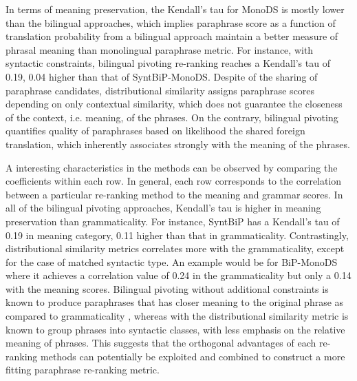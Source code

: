 \documentclass[11pt]{article}
\begin{document}
In terms of meaning preservation, the Kendall's tau for MonoDS is mostly lower than the bilingual approaches, which implies paraphrase score as a function of translation probability from a bilingual approach maintain a better measure of phrasal meaning than monolingual paraphrase metric. For instance, with syntactic constraints, bilingual pivoting re-ranking reaches a Kendall's tau of 0.19, 0.04 higher than that of SyntBiP-MonoDS. Despite of the sharing of paraphrase candidates, distributional similarity assigns paraphrase scores depending on only contextual similarity, which does not guarantee the closeness of the context, i.e. meaning, of the phrases. On the contrary, bilingual pivoting quantifies quality of paraphrases based on likelihood the shared foreign translation, which inherently associates strongly with the meaning of the phrases.

A interesting characteristics in the methods can be observed by comparing the coefficients within each row. In general, each row corresponds to the correlation between a particular re-ranking method to the meaning and grammar scores. In all of the bilingual pivoting approaches, Kendall's tau is higher in meaning preservation than grammaticality. For instance, SyntBiP has a Kendall's tau of 0.19 in meaning category, 0.11 higher than that in grammaticality. Contrastingly, distributional similarity metrics correlates more with the grammaticality, except for the case of matched syntactic type.     An example would be for BiP-MonoDS where it achieves a correlation value of 0.24 in the grammaticality but only a 0.14 with the meaning scores. Bilingual pivoting without additional constraints is known to produce paraphrases that has closer meaning to the original phrase as compared to grammaticality \cite{BannardCallisonBurch05}, whereas with the distributional similarity metric is known to group phrases into syntactic classes, with less emphasis on the relative meaning of phrases. This suggests that the orthogonal advantages of each re-ranking methods can potentially be exploited and combined to construct a more fitting paraphrase re-ranking metric.
\end{document}
